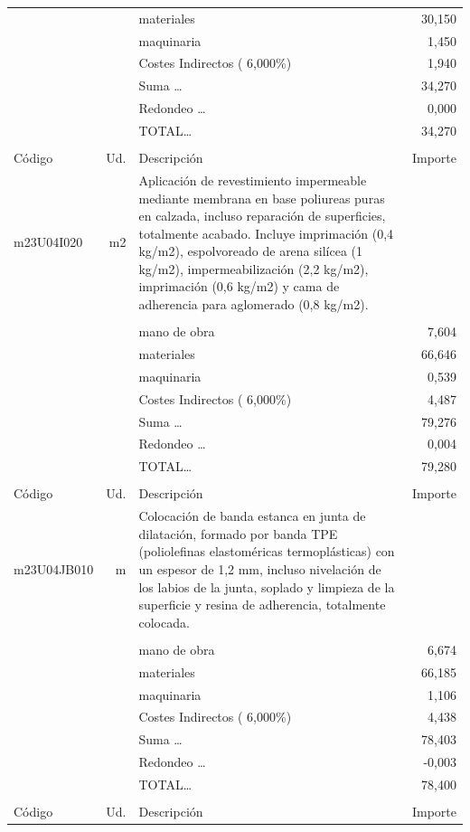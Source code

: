 \begin{supertabular}{l r p{60mm} r}
&&materiales&    30,150\\%
&&maquinaria&     1,450\\%
&&Costes Indirectos (     6,000\%)&     1,940\\%
&&Suma \ldots&    34,270\\%
&&Redondeo \ldots&     0,000\\%
%
&&TOTAL\ldots&    34,270\\%
&&&\\%
Código&Ud.&Descripción&Importe\\%
\hline%
m23U04I020&m2&Aplicación de revestimiento impermeable mediante membrana en base poliureas puras en calzada, incluso reparación de superficies, totalmente acabado. Incluye imprimación (0,4 kg/m2), espolvoreado de arena silícea (1 kg/m2), impermeabilización (2,2 kg/m2), imprimación (0,6 kg/m2) y cama de adherencia para aglomerado (0,8 kg/m2).&\\%
&&&\\%
&&mano de obra&     7,604\\%
&&materiales&    66,646\\%
&&maquinaria&     0,539\\%
&&Costes Indirectos (     6,000\%)&     4,487\\%
&&Suma \ldots&    79,276\\%
&&Redondeo \ldots&     0,004\\%
%
&&TOTAL\ldots&    79,280\\%
&&&\\%
Código&Ud.&Descripción&Importe\\%
\hline%
m23U04JB010&m&Colocación de banda estanca en junta de dilatación, formado por banda TPE (poliolefinas elastoméricas termoplásticas) con un espesor de 1,2 mm, incluso nivelación de los labios de la junta, soplado y limpieza de la superficie y resina de adherencia, totalmente colocada.&\\%
&&&\\%
&&mano de obra&     6,674\\%
&&materiales&    66,185\\%
&&maquinaria&     1,106\\%
&&Costes Indirectos (     6,000\%)&     4,438\\%
&&Suma \ldots&    78,403\\%
&&Redondeo \ldots&    {-}0,003\\%
%
&&TOTAL\ldots&    78,400\\%
&&&\\%
Código&Ud.&Descripción&Importe\\%

\end{supertabular}
